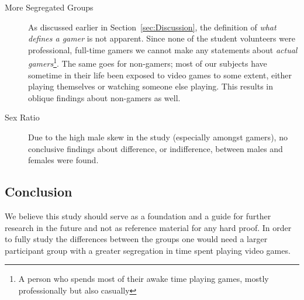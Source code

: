 \documentclass[runningheads,a4paper,oribibl]{llncs}
\begin{document}
\begin{description}
	\item[More Segregated Groups] As discussed earlier in Section~\ref{sec:Discussion}, the definition of \emph{what defines a gamer} is not apparent. Since none of the student volunteers were professional, full-time gamers we cannot make any statements about \emph{actual gamers}\footnote{A person who spends most of their awake time playing games, mostly professionally but also casually}. The same goes for non-gamers; most of our subjects have sometime in their life been exposed to video games to some extent, either playing themselves or watching someone else playing. This results in oblique findings about non-gamers as well.

	\item[Sex Ratio] Due to the high male skew in the study (especially amongst gamers), no conclusive findings about difference, or indifference, between males and females were found.
\end{description}



\subsection{Conclusion}
We believe this study should serve as a foundation and a guide for further research in the future and not as reference material for any hard proof. In order to fully study the differences between the groups one would need a larger participant group with a greater segregation in time spent playing video games.









\end{document}
